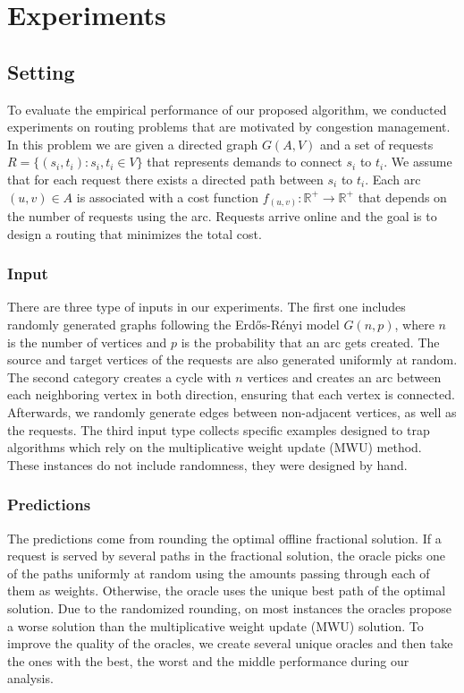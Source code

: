 
\section{Experiments} \label{sec:exp}

\subsection{Setting}
To evaluate the empirical performance of our proposed algorithm, we conducted experiments on routing problems
that are motivated by congestion management.
In this problem we are given a directed graph $G(A,V)$ and a set of requests $R = \{(s_{i}, t_{i}) : s_{i}, t_{i} \in V\}$ that represents demands to connect $s_{i}$ to $t_{i}$. We assume that for each request there exists a directed path between $s_{i}$ to $t_{i}$.
Each arc $(u, v) \in A$ is associated with a cost function $f_{(u,v)}: \mathbb{R}^{+} \rightarrow \mathbb{R}^{+}$ that depends on the number of requests using the arc.
Requests arrive online and the goal is to design a routing that minimizes the total cost.


\subsubsection{Input}
There are three type of inputs in our experiments. The first one includes randomly generated graphs following the Erd\H{o}s-Rényi model $G(n, p)$, where $n$ is the number of vertices and $p$ is the probability that an arc gets created. The source and target vertices of the requests are also generated uniformly at random. The second category creates a cycle with $n$ vertices and creates an arc between each neighboring vertex in both direction, ensuring that each vertex is connected. Afterwards, we randomly generate edges between non-adjacent vertices, as well as the requests.
The third input type collects specific examples designed to trap algorithms which rely on the multiplicative weight update (MWU) method. These instances do not include randomness, they were designed by hand.


\subsubsection{Predictions}
The predictions come from rounding the optimal offline fractional solution. If a request is served by several paths in the fractional solution, the oracle picks one of the paths uniformly at random using the amounts passing through each of them as weights. Otherwise, the oracle uses the unique best path of the optimal solution. Due to the randomized rounding, on most instances the oracles propose a worse solution than the multiplicative weight update (MWU) solution. To improve the quality of the oracles, we create several unique oracles and then take the ones with the best, the worst and the middle performance during our analysis.


